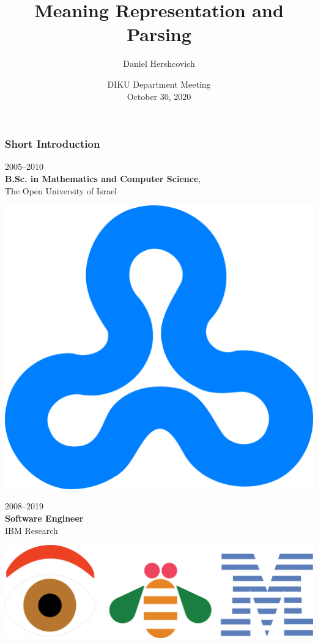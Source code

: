 \documentclass[t,xcolor={svgnames,table}]{beamer}
\begin{document}
\title[]{Meaning Representation and Parsing}
\author{Daniel Hershcovich}
\date{DIKU Department Meeting \\ October 30, 2020}

\begin{frame}
\titlepage
\end{frame}

\begin{frame}
\frametitle{Short Introduction}
\begin{minipage}{.7\textwidth}
2005--2010 \\
\textbf{B.Sc. in Mathematics and Computer Science}, \\
The Open University of Israel
\end{minipage}
\begin{minipage}{.2\textwidth}
\includegraphics[width=\textwidth]{Open_university_israel_logo.png}
\end{minipage}

\vfill\pause

\begin{minipage}{.7\textwidth}
2008--2019 \\
\textbf{Software Engineer} \\
IBM Research
\end{minipage}
\begin{minipage}{.25\textwidth}
\includegraphics[width=\textwidth]{eye_bee_m.png}
\end{minipage}


\end{frame}
\end{document}
